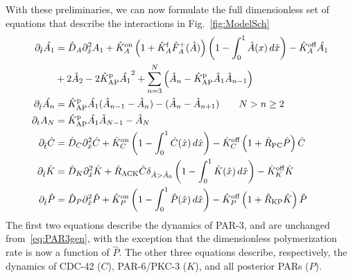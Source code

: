 \documentclass[11pt]{article}
\newcommand{\6}[1]{#1_{\text{6}}}
\newcommand{\3}[1]{#1_{\text{3}}}
\begin{document}
With these preliminaries, we can now formulate the full dimensionless set of equations that describe the  interactions in Fig.\ \ref{fig:ModelSch}
\begin{subequations}
\label{eq:AllBC}
\begin{align}
\partial_{\hat{t}} \hat{A_1} & = \hat{D}_A \partial_{\hat{x}}^2 A_1 +\hat{K}^\text{on}_A \left(1+\hat{K}^\text{f}_A \hat F_A^+(\hat A) \right)\left(1 - \int_0^1 \hat A(x) \, d\hat{x} \right)- \hat{K}^\text{off}_A \hat{A_1} \\ 
 &+ 2 \hat{A}_2-2\hat{K}^\text{p}_\text{AP} \hat{A_1}^2+\sum_{n=3}^N \left(\hat A_n-\hat{K}^\text{p}_\text{AP} \hat A_1 \hat A_{n-1}\right)  \\
\partial_{\hat{t}} \hat{A_n} & =\hat{K}^\text{p}_\text{AP} \hat{A_1} (\hat A_{n-1}-\hat A_n) - (\hat A_n-\hat A_{n+1})  \qquad N > n \geq 2 \\ 
\partial_t A_N & =\hat{K}^\text{p}_\text{AP} \hat {A_1} \hat A_{N-1}- \hat A_N \\ 
\label{eq:Ceqn}
\partial_{\hat{t}} \hat{C}& =\hat{D}_C \partial_{\hat{x}}^2 \hat{C} +\hat{K}^\text{on}_C \left(1 - \int_0^1 \hat{C}(\hat x) \, d\hat{x} \right)  - \hat{K}^\text{off}_C \left(1+\hat{R}_\text{PC}\hat P\right)\hat{C}\\
\label{eq:Keqn}
\partial_{\hat{t}} \hat{K}  &= \hat{D}_K \partial_{\hat{x}}^2 \hat{K} + \hat{R}_\text{ACK} \hat{C} \delta_{\hat A > \hat A_0} \left(1 - \int_0^1 \hat{K}(\hat x) \, d\hat{x} \right)-\hat{K}^\text{off}_K \hat{K} \\
\partial_{\hat{t}} \hat{P} & =\hat{D}_P \partial_{\hat{x}}^2 \hat{P} +\hat{K}^\text{on}_P \left(1 - \int_0^1 \hat{P}(\hat x) \, d\hat{x} \right)  - \hat{K}^\text{off}_P \left(1+\hat{R}_\text{KP}\hat{K}\right)\hat{P}
\end{align}
\end{subequations}
The first two equations describe the dynamics of PAR-3, and are unchanged from\ \eqref{eq:PAR3gen}, with the exception that the dimensionless polymerization rate is now a function of $\hat P$. The other three equations describe, respectively, the dynamics of CDC-42 ($C$), PAR-6/PKC-3 ($K$), and all posterior PARs ($P$). 
\end{document}
